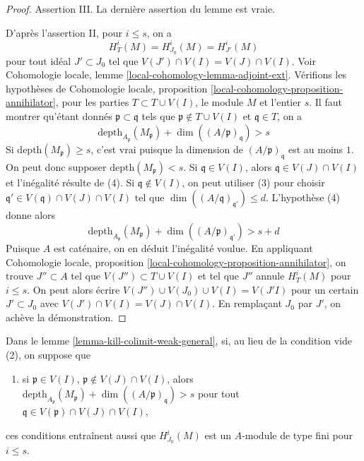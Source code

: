 \begin{proof}
\medskip\noindent
Assertion III. La dernière assertion du lemme est vraie.

\medskip\noindent
D'après l'assertion II, pour $i \leq s$, on a
$$
H^i_T(M) = H^i_{J_0}(M) = H^i_{J'}(M)
$$
pour tout idéal $J' \subset J_0$ tel que $V(J')  \cap V(I) = V(J) \cap V(I)$.
Voir Cohomologie locale, lemme \ref{local-cohomology-lemma-adjoint-ext}.
Vérifions les hypothèses de Cohomologie locale,
proposition \ref{local-cohomology-proposition-annihilator},
pour les parties $T \subset T \cup V(I)$, le module $M$ et l'entier $s$.
Il faut montrer qu'étant donnés $\mathfrak p \subset \mathfrak q$
tels que $\mathfrak p \not \in T \cup V(I)$ et $\mathfrak q \in T$,
on a
$$
\text{depth}_{A_\mathfrak p}(M_\mathfrak p) +
\dim((A/\mathfrak p)_\mathfrak q) > s
$$
Si $\text{depth}(M_\mathfrak p) \geq s$, c'est vrai puisque
la dimension de $(A/\mathfrak p)_\mathfrak q$ est au moins $1$.
On peut donc supposer $\text{depth}(M_\mathfrak p) < s$.
Si $\mathfrak q \in V(I)$, alors $\mathfrak q \in V(J) \cap V(I)$
et l'inégalité résulte de (4). Si $\mathfrak q \not \in V(I)$,
on peut utiliser (3) pour choisir
$\mathfrak q' \in V(\mathfrak q) \cap V(J) \cap V(I)$ tel que
$\dim((A/\mathfrak q)_{\mathfrak q'}) \leq d$.
L'hypothèse (4) donne alors
$$
\text{depth}_{A_\mathfrak p}(M_\mathfrak p) +
\dim((A/\mathfrak p)_{\mathfrak q'}) > s + d
$$
Puisque $A$ est caténaire, on en déduit l'inégalité voulue.
En appliquant Cohomologie locale,
proposition \ref{local-cohomology-proposition-annihilator}, on
trouve $J'' \subset A$ tel que $V(J'') \subset T \cup V(I)$
et tel que $J''$ annule $H^i_T(M)$ pour $i \leq s$.
On peut alors écrire $V(J'') \cup V(J_0) \cup V(I) = V(J'I)$
pour un certain $J' \subset J_0$ avec $V(J') \cap V(I) = V(J) \cap V(I)$.
En remplaçant $J_0$ par $J'$, on achève la démonstration.
\end{proof}

\begin{lemma}
\label{lemma-kill-colimit-general}
Dans le lemme \ref{lemma-kill-colimit-weak-general}, si, au lieu de la condition
vide (2), on suppose que
\begin{enumerate}
\item[(2')] si $\mathfrak p \in V(I)$, $\mathfrak p \not \in V(J) \cap V(I)$,
alors
$\text{depth}_{A_\mathfrak p}(M_\mathfrak p) +
\dim((A/\mathfrak p)_\mathfrak q) > s$
pour tout $\mathfrak q \in V(\mathfrak p) \cap V(J) \cap V(I)$,
\end{enumerate}
ces conditions entraînent aussi que $H^i_{J_0}(M)$ est un
$A$-module de type fini pour $i \leq s$.
\end{lemma}

